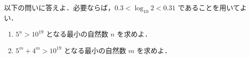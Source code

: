 ﻿\documentclass[../../../uem_tok_q.tex]{subfiles}
\begin{document}
    以下の問いに答えよ．必要ならば，$0.3<\log_{10}2<0.31$ であることを用いてよい．

    \begin{enumerate}
        \item $5^n>10^{19}$ となる最小の自然数 $n$ を求めよ．
        \item $5^m+4^m>10^{19}$ となる最小の自然数 $m$ を求めよ．
    \end{enumerate}
\end{document}

